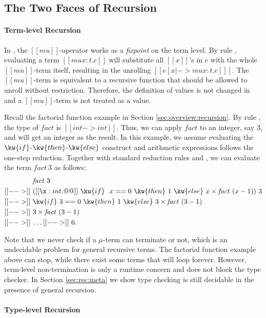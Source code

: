 \subsection{The Two Faces of Recursion}
\label{sec:rec:recur}
\paragraph{Term-level Recursion}

In \name, the $[[mu]]$-operator works as a \emph{fixpoint} on the term
level. By rule , evaluating a term $[[mu x:t.e]]$ will
substitute all $[[x]]$'s in $e$ with the whole $[[mu]]$-term itself,
resulting in the unrolling $[[e [x |-> mu x:t.e] ]]$. The
$[[mu]]$-term is equivalent to a recursive function that should be
allowed to unroll without restriction. Therefore, the definition of
values is not changed in \name and a $[[mu]]$-term is not treated as a
value. 

Recall the factorial function example in Section
\ref{sec:overview:recursion}.
By rule , the type of $\mathit{fact}$ is $[[int ->
    int]]$. Thus, we can apply $\mathit{fact}$ to an integer, say $3$,
and will get an integer as the result. In this example, we assume
evaluating the $\kw{if}$-$\kw{then}$-$\kw{else}$ construct and 
arithmetic expressions follows the one-step
reduction. Together with standard reduction rules  and
, we can evaluate the term $\mathit{fact}~3$ as
follows:
\begin{align*}
    &\mathit{fact}~3 \\ [[-->]]~& ([[\x : int . @@]]~\kw{if}~
  ~x==0~\kw{then}~1~\kw{else}~x \times \mathit{fact}~(x - 1))~3
  \\ [[-->]]~ & \kw{if}~3==0~\kw{then}~1~\kw{else}~3 \times
  \mathit{fact}~(3 - 1) \\ [[-->]]~& 3 \times \mathit{fact}~(3-1)
  \\ [[-->]]~& \dots [[-->]]~ 6. 
\end{align*}

Note that we never check if a $\mu$-term can terminate or not, which
is an undecidable problem for general recursive terms. The
factorial function example above can stop, while there exist some
terms that will loop forever. However, term-level non-termination is
only a runtime concern and does not block the type checker. In Section
\ref{sec:rec:meta} we show type checking \name is still decidable
in the presence of general recursion.

\paragraph{Type-level Recursion}

